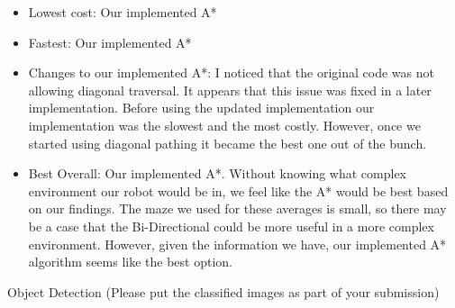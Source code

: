 \documentclass[12pt]{exam}
\begin{document}
\begin{questions}
    \begin{itemize}
            \item Lowest cost: Our implemented A*
            \item Fastest: Our implemented A*
            \item Changes to our implemented A*: I noticed that the original code was not allowing diagonal traversal. It appears that this issue was fixed in a later implementation. Before using the updated implementation our implementation was the slowest and the most costly. However, once we started using diagonal pathing it became the best one out of the bunch.
            \item Best Overall: Our implemented A*. Without knowing what complex environment our robot would be in, we feel like the A* would be best based on our findings. The maze we used for these averages is small, so there may be a case that the Bi-Directional could be more useful in a more complex environment. However, given the information we have, our implemented A* algorithm seems like the best option.
    \end{itemize}
\newpage

\addpoints
\question[20]
    Object Detection (Please put the classified images as part of your submission)

\noaddpoints
{}
\end{questions}
\end{document}
